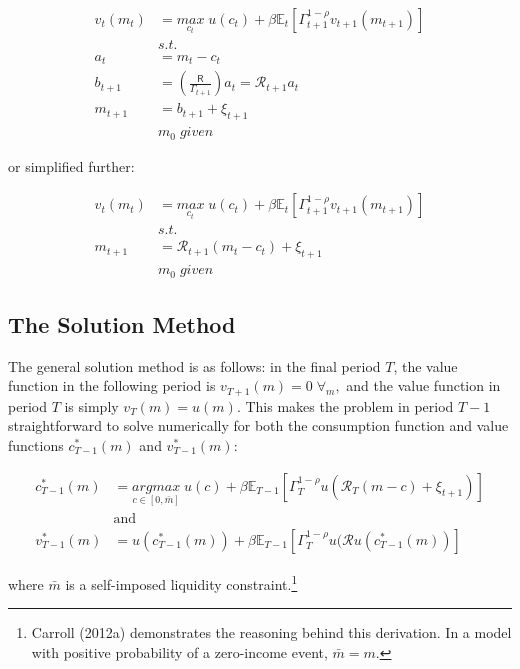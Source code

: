 \documentclass[]{article}
\begin{document}
\[
\begin{aligned}
v_t(m_t) & = \underset{c_{t}}{max} \; u(c_t) + \beta \mathbb{E}_{t} \left[ \Gamma_{t+1}^{1-\rho} v_{t+1}(m_{t+1}) \right] \\
& s.t. \\
a_{t} & = m_t - c_t \\
b_{t+1} & = \left( \frac{\mathsf{R}}{\Gamma_{t+1}} \right) a_t = \mathcal{R}_{t+1} a_t \\
m_{t+1} & = b_{t+1} + \xi_{t+1} \\
& m_0\;given
\end{aligned}
\]

or simplified further:

\[
\begin{aligned}
v_t(m_t) & = \underset{c_{t}}{max} \; u(c_t) + \beta \mathbb{E}_{t} \left[ \Gamma_{t+1}^{1-\rho} v_{t+1}(m_{t+1}) \right] \\
& s.t. \\
m_{t+1} & = \mathcal{R}_{t+1}(m_t - c_t) + \xi_{t+1} \\
& m_0\;given
\end{aligned}
\]

\subsection{The Solution Method}\label{the-solution-method}

The general solution method is as follows: in the final period $T$, the
value function in the following period is $v_{T+1}(m) = 0 \; \forall_m,$
and the value function in period $T$ is simply $v_{T}(m) = u(m).$ This
makes the problem in period $T-1$ straightforward to solve numerically
for both the consumption function and value functions $c_{T-1}^{*}(m)$
and $v_{T-1}^{*}(m)$:

\[
\begin{aligned}
c_{T-1}^{*}(m) & = \underset{c \in [0, \bar{m}]}{argmax} \; u(c) + \beta \mathbb{E}_{T-1} \left[ \Gamma_{T}^{1-\rho} u(\mathcal{R}_{T}(m - c) + \xi_{t+1}) \right] \\
& \mathrm{and} \\
v_{T-1}^{*}(m) & = u(c_{T-1}^{*}(m)) + \beta \mathbb{E}_{T-1} \left[ \Gamma_{T}^{1-\rho} u(\mathcal{R}u(c_{T-1}^{*}(m)) \right]
\end{aligned}
\]

where $\bar{m}$ is a self-imposed liquidity constraint.\footnote{Carroll
  (2012a) demonstrates the reasoning behind this derivation. In a model
  with positive probability of a zero-income event, $\bar{m}=m$.}
\end{document}
